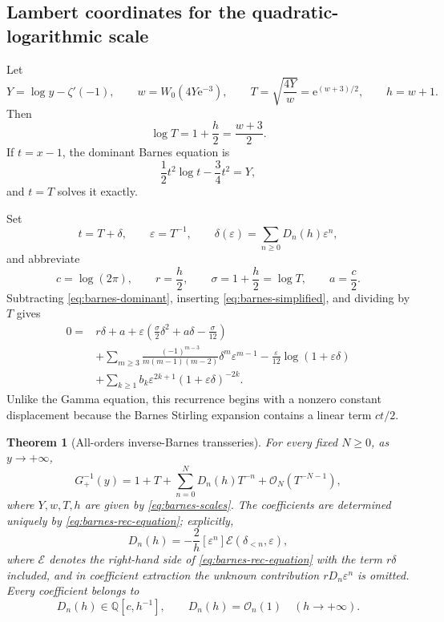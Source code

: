 \documentclass[11pt]{article}
\newtheorem{theorem}{Theorem}[section]
\theoremstyle{definition}
\theoremstyle{remark}
\newcommand{\e}{\mathrm e}
\newcommand{\BigO}{\mathcal O}
\newcommand{\Q}{\mathbb Q}
\newcommand{\calE}{\mathcal E}
\newcommand{\Barinv}{G_{+}^{-1}}
\begin{document}
\subsection{Lambert coordinates for the quadratic-logarithmic scale}

Let
\begin{equation}\label{eq:barnes-scales}
 Y=\log y-\zeta'(-1),\qquad
 w=W_0(4Y\e^{-3}),\qquad
 T=\sqrt{\frac{4Y}{w}}=\e^{(w+3)/2},\qquad
 h=w+1.
\end{equation}
Then
\[
 \log T=1+\frac h2=\frac{w+3}{2}.
\]
If \(t=x-1\), the dominant Barnes equation is
\begin{equation}\label{eq:barnes-dominant}
 \frac12t^2\log t-\frac34t^2=Y,
\end{equation}
and \(t=T\) solves it exactly.

Set
\begin{equation}\label{eq:barnes-delta}
 t=T+\delta,\qquad \varepsilon=T^{-1},\qquad
 \delta(\varepsilon)=\sum_{n\ge0}D_n(h)\varepsilon^n,
\end{equation}
and abbreviate
\[
 c=\log(2\pi),\qquad r=\frac h2,
 \qquad \sigma=1+\frac h2=\log T,
 \qquad a=\frac c2.
\]
Subtracting \cref{eq:barnes-dominant}, inserting \cref{eq:barnes-simplified}, and dividing by \(T\) gives
\begin{equation}\label{eq:barnes-rec-equation}
\begin{split}
0={}&r\delta+a
 +\varepsilon\left(\frac{\sigma}{2}\delta^2+a\delta-\frac{\sigma}{12}\right)\\
&+\sum_{m\ge3}\frac{(-1)^{m-3}}{m(m-1)(m-2)}
 \delta^m\varepsilon^{m-1}
 -\frac{\varepsilon}{12}\log(1+\varepsilon\delta)\\
&+\sum_{k\ge1}b_k\varepsilon^{2k+1}
 (1+\varepsilon\delta)^{-2k}.
\end{split}
\end{equation}
Unlike the Gamma equation, this recurrence begins with a nonzero constant displacement because the Barnes Stirling expansion contains a linear term \(ct/2\).

\begin{theorem}[All-orders inverse-Barnes transseries]\label{thm:barnes-all-orders}
For every fixed \(N\ge0\), as \(y\to+\infty\),
\begin{equation}\label{eq:barnes-all-orders}
 \Barinv(y)=1+T+\sum_{n=0}^{N}D_n(h)T^{-n}
 +\mathcal O_N(T^{-N-1}),
\end{equation}
where \(Y,w,T,h\) are given by \cref{eq:barnes-scales}.  The coefficients are determined uniquely by \cref{eq:barnes-rec-equation}; explicitly,
\begin{equation}\label{eq:barnes-triangular}
 D_n(h)=-\frac{2}{h}[\varepsilon^n]
 \calE(\delta_{<n},\varepsilon),
\end{equation}
where \(\calE\) denotes the right-hand side of
\cref{eq:barnes-rec-equation} with the term \(r\delta\) included, and in coefficient extraction the unknown contribution \(rD_n\varepsilon^n\) is omitted.  Every coefficient belongs to
\begin{equation}\label{eq:barnes-ring}
 D_n(h)\in\Q[c,h^{-1}],
 \qquad D_n(h)=\BigO_n(1)
 \quad(h\to+\infty).
\end{equation}
\end{theorem}
\end{document}
